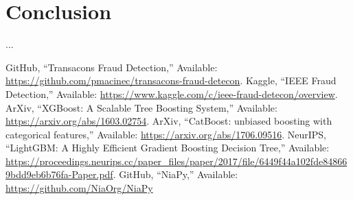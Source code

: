 \documentclass[conference]{IEEEtran}
\begin{document}
\section{Conclusion}
...

\begin{thebibliography}{00}
	 GitHub, ``Transacons Fraud Detection,'' Available: \url{https://github.com/pmacinec/transacons-fraud-detecon}.
	 Kaggle, ``IEEE Fraud Detection,'' Available: \url{https://www.kaggle.com/c/ieee-fraud-detecon/overview}.
	 ArXiv, ``XGBoost: A Scalable Tree Boosting System,'' Available: \url{https://arxiv.org/abs/1603.02754}.
	 ArXiv, ``CatBoost: unbiased boosting with categorical features,'' Available: \url{https://arxiv.org/abs/1706.09516}.
	 NeurIPS, ``LightGBM: A Highly Efficient Gradient Boosting Decision Tree,'' Available: \url{https://proceedings.neurips.cc/paper_files/paper/2017/file/6449f44a102fde848669bdd9eb6b76fa-Paper.pdf}.
	 GitHub, ``NiaPy,'' Available: \url{https://github.com/NiaOrg/NiaPy}
\end{thebibliography}

\vspace{12pt}
\end{document}
